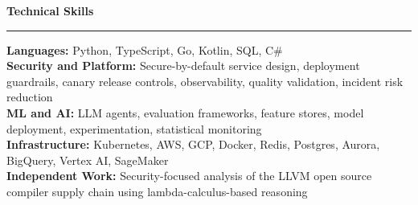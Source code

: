 \documentclass[10pt,letterpaper]{article}
\newcommand{\sectiontitle}[1]{%
  \vspace{0.6em}
  {\large \textbf{#1}}\par
  \vspace{0.15em}
  \hrule
  \vspace{0.35em}
}
\begin{document}
\sectiontitle{Technical Skills}
\textbf{Languages:} Python, TypeScript, Go, Kotlin, SQL, C\#\\
\textbf{Security and Platform:} Secure-by-default service design, deployment guardrails, canary release controls, observability, quality validation, incident risk reduction\\
\textbf{ML and AI:} LLM agents, evaluation frameworks, feature stores, model deployment, experimentation, statistical monitoring\\
\textbf{Infrastructure:} Kubernetes, AWS, GCP, Docker, Redis, Postgres, Aurora, BigQuery, Vertex AI, SageMaker\\
\textbf{Independent Work:} Security-focused analysis of the LLVM open source compiler supply chain using lambda-calculus-based reasoning
\end{document}
